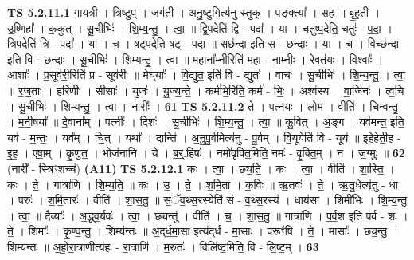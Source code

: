 \documentclass[17pt]{extarticle}
\begin{document}
                                \textbf{ TS 5.2.11.1} \newline
                  गा॒य॒त्री । त्रि॒ष्टुप् । जग॑ती । अ॒नु॒ष्टुगित्य॑नु-स्तुक् । प॒ङ्क्त्या᳚ । स॒ह ॥ बृ॒ह॒ती । उ॒ष्णिहा᳚ । क॒कुत् । सू॒चीभिः॑ । शि॒म्य॒न्तु॒ । त्वा॒ ॥ द्वि॒पदेति॑ द्वि - पदा᳚ । या । चतु॑ष्प॒देति॒ चतुः॑ - प॒दा॒ । त्रि॒पदेति॑ त्रि - पदा᳚ । या । च॒ । षट्प॒देति॒ षट् - प॒दा॒ ॥ सछ॑न्दा॒ इति॒ स - छ॒न्दाः॒ । या । च॒ । विच्छ॑न्दा॒ इति॒ वि - छ॒न्दाः॒ । सू॒चीभिः॑ । शि॒म्य॒न्तु॒ । त्वा॒ ॥ म॒हाना᳚म्नी॒रिति॑ म॒हा - ना॒म्नीः॒ । रे॒वत॑यः । विश्वाः᳚ । आशाः᳚ । प्र॒सूव॑री॒रिति॑ प्र - सूव॑रीः ॥ मेघ्‌याः᳚ । वि॒द्युत॒ इति॑ वि - द्युतः॑ । वाचः॑ । सू॒चीभिः॑ । शि॒म्य॒न्तु॒ । त्वा॒ ॥ र॒ज॒ताः । हरि॑णीः । सीसाः᳚ । युजः॑ । यु॒ज्य॒न्ते॒ । कर्म॑भि॒रिति॒ कर्म॑ -  भिः॒ ॥ अश्व॑स्य । वा॒जिनः॑ । त्व॒चि । सू॒चीभिः॑ । शि॒म्य॒न्तु॒ । त्वा॒ ॥ नारीः᳚ । \textbf{  61} \newline
                  \newline
                                \textbf{ TS 5.2.11.2} \newline
                  ते । पत्न॑यः । लोम॑ । वीति॑ । चि॒न्व॒न्तु॒ । म॒नी॒षया᳚ ॥ दे॒वाना᳚म् । पत्नीः᳚ । दिशः॑ । सू॒चीभिः॑ । शि॒म्य॒न्तु॒ । त्वा॒ ॥ कु॒वित् । अ॒ङ्ग । यव॑मन्त॒ इति॒ यव॑ - म॒न्तः॒ । यव᳚म् । चि॒त् । यथा᳚ । दान्ति॑ । अ॒नु॒पू॒र्वमित्य॑नु - पू॒र्वम् । वि॒यूयेति॑ वि - यूय॑ ॥ इ॒हेहेती॒ह - इ॒ह॒ । ए॒षा॒म् । कृ॒णु॒त॒ । भोज॑नानि । ये । ब॒र्॒.हिषः॑ । नमो॑वृक्ति॒मिति॒ नमः॑ - वृ॒क्ति॒म् । न । ज॒ग्मुः ॥ \textbf{  62} \newline
                  \newline
                      (नारी᳚ - स्त्रिꣳ॒॒शच्च॑)  \textbf{(A11)} \newline \newline
                                \textbf{ TS 5.2.12.1} \newline
                  कः । त्वा॒ । छ्य॒ति॒ । कः । त्वा॒ । वीति॑ । शा॒स्ति॒ । कः । ते॒ । गात्रा॑णि । शि॒म्य॒ति॒ ॥ कः । उ॒ । ते॒ । श॒मि॒ता । क॒विः ॥ ऋ॒तवः॑ । ते॒ । ऋ॒तु॒धेत्यृ॑तु - धा । परुः॑ । श॒मि॒तारः॑ । वीति॑ । शा॒स॒तु॒ ॥ सं॒ॅव॒थ्स॒रस्येति॑ सं - व॒थ्स॒रस्य॑ । धाय॑सा । शिमी॑भिः । शि॒म्य॒न्तु॒ । त्वा॒ ॥ दैव्याः᳚ । अ॒द्ध्व॒र्यवः॑ । त्वा॒ । छ्यन्तु॑ । वीति॑ । च॒ । शा॒स॒तु॒ ॥ गात्रा॑णि । प॒र्व॒श इति॑ पर्व - शः । ते॒ । शिमाः᳚ । कृ॒ण्व॒न्तु॒ । शिम्य॑न्तः ॥ अ॒द्‌र्ध॒मा॒सा इत्य॑द्‌र्ध - मा॒साः । परूꣳ॑षि । ते॒ । मासाः᳚ । छ्य॒न्तु॒ । शिम्य॑न्तः ॥ अ॒हो॒रा॒त्राणीत्य॑हः - रा॒त्राणि॑ । म॒रुतः॑ । विलि॑ष्ट॒मिति॒ वि - लि॒ष्ट॒म् । \textbf{  63 } \newline
                  \newline
\end{document}
